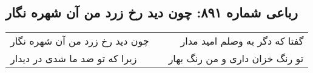 \begin{center}
\section*{رباعی شماره ۸۹۱: چون دید رخ زرد من آن شهره نگار}
\label{sec:0891}
\begin{longtable}{l p{0.5cm} r}
چون دید رخ زرد من آن شهره نگار
&&
گفتا که دگر به وصلم امید مدار
\\
زیرا که تو ضد ما شدی در دیدار
&&
تو رنگ خزان داری و من رنگ بهار
\\
\end{longtable}
\end{center}

